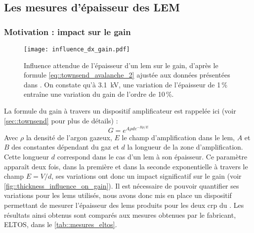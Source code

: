     \subsection{Les mesures d’épaisseur des LEM}\label{sec::epaisseur}
        
      \subsubsection{Motivation : impact sur le gain}
            
        \begin{figure}[htbp]
          \centering
          \texttt{[image: influence\_dx\_gain.pdf]}
          \caption[Influence de l'épaisseur d'un LEM sur le gain]{Influence attendue de l'épaisseur d'un \gls{lem} sur le gain, d'après le formule \eqref{eq::townsend_avalanche_2} ajustée aux données présentées dans \cite{Cantini2014}. On constate qu'à \SI{3.1}{\kilo\volt}, une variation de l'épaisseur de 1\,\% entraîne une variation du gain de l'ordre de 10\,\%.}
          \label{fig::thickness_influence_on_gain}
        \end{figure}
            
        La formule du gain à travers un dispositif amplificateur est rappelée ici (voir \autoref{sec::townsend} pour plus de détails) :
        \begin{equation}\label{eq::townsend_avalanche_2}
          G = e^{A\rho d e^{-B\rho /E}}
        \end{equation}
        Avec $\rho$ la densité de l'argon gazeux, $E$ le champ d'amplification dans le \gls{lem}, $A$ et $B$ des constantes dépendant du gaz et $d$ la longueur de la zone d'amplification. Cette longueur $d$ correspond dans le cas d'un \gls{lem} à son épaisseur. Ce paramètre apparaît deux fois, dans la première et dans la seconde exponentielle à travers le champ $E = V/d$, ses variations ont donc un impact significatif sur le gain (voir \autoref{fig::thickness_influence_on_gain}). Il est nécessaire de pouvoir quantifier ses variations pour les \glspl{lem} utilisés, nous avons donc mis en place un dispositif permettant de mesurer l'épaisseur des \glspl{lem} produits pour les deux \gls{crp} du \SSS{}. Les résultats ainsi obtenus sont comparés aux mesures obtenues par le fabricant, ELTOS, dans le \autoref{tab::mesures_eltos}.
                
